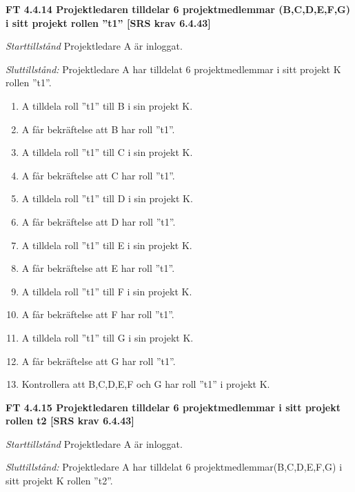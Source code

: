 \documentclass[a4paper]{article}
\begin{document}
\textbf{FT 4.4.14 Projektledaren tilldelar 6 projektmedlemmar (B,C,D,E,F,G) i sitt projekt rollen ''t1'' [SRS krav 6.4.43]}

\emph{Starttillstånd} Projektledare A är inloggat.

\emph{Sluttillstånd:} Projektledare A  har tilldelat 6 projektmedlemmar i sitt projekt K  rollen ''t1''.

\begin{enumerate}
\item A tilldela roll ”t1” till B i sin projekt K. 
\item A får bekräftelse att B har roll ”t1”.
\item A tilldela roll ”t1” till C i sin projekt K. 
\item A får bekräftelse att C har roll ”t1”.
\item A tilldela roll ”t1” till D i sin projekt K.
\item A får bekräftelse att D har roll ”t1”.
\item A tilldela roll ”t1” till E i sin projekt K. 
\item A får bekräftelse att E har roll ”t1”.
\item A tilldela roll ”t1” till F i sin projekt K. 
\item A får bekräftelse att F har roll ”t1”.
\item A tilldela roll ”t1” till G i sin projekt K. 
\item A får bekräftelse att G har roll ”t1”.
\item Kontrollera att B,C,D,E,F och G har roll ”t1” i projekt K.
\end{enumerate}
\textbf{FT 4.4.15 Projektledaren tilldelar 6 projektmedlemmar i sitt projekt rollen t2 [SRS krav 6.4.43]}

\emph{Starttillstånd} Projektledare A är inloggat.

\emph{Sluttillstånd:} Projektledare A  har tilldelat 6 projektmedlemmar(B,C,D,E,F,G) i sitt projekt K rollen ''t2''.
\end{document}
